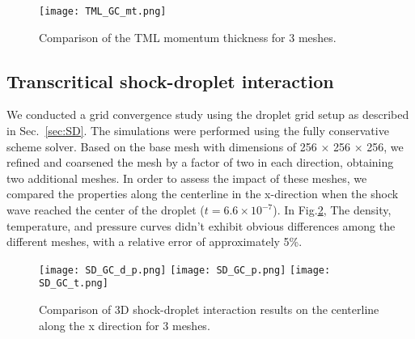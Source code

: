\begin{figure}[htbp]
\centering
\texttt{[image: TML\_GC\_mt.png]}
\caption{Comparison of the TML momentum thickness for 3 meshes.}
\label{TML_GC} 
\end{figure}

\subsection{Transcritical shock-droplet interaction} 
\label{App:SD}


We conducted a grid convergence study using the  droplet grid setup as described in Sec.~\ref{sec:SD}. The simulations were performed using the fully conservative scheme solver. Based on the base mesh with dimensions of 256 × 256 × 256, we refined and coarsened the mesh by a factor of two in each direction, obtaining two additional meshes. In order to assess the impact of these meshes, we compared the properties along the centerline in the x-direction when the shock wave reached the center of the droplet ($t=6.6\times 10^{-7}$). In Fig.\ref{SG_GC}, The density, temperature, and pressure curves didn't exhibit obvious differences among the different meshes, with a relative error of approximately 5\%.


\begin{figure}[htbp]
\centering
\texttt{[image: SD\_GC\_d\_p.png]}
\texttt{[image: SD\_GC\_p.png]}
\texttt{[image: SD\_GC\_t.png]}
\caption{Comparison of 3D shock-droplet interaction results on the centerline along the x direction for 3 meshes.}
\label{SG_GC} 
\end{figure}

